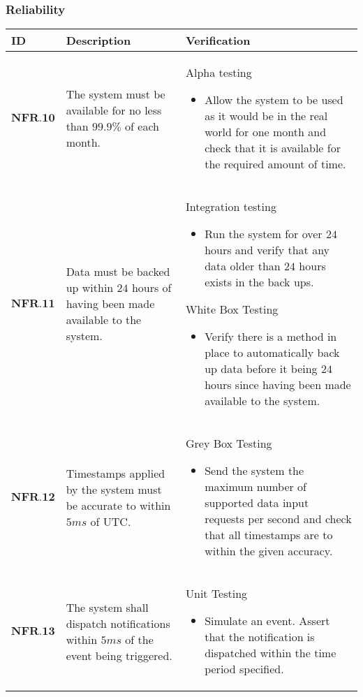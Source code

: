 \subsubsection{Reliability}
\begin{longtable}[H]{|p{1.5cm}|p{4.5cm}|p{10.5cm}|}
    \hline
    \cellcolor{titleColor}\textbf{ID} & \cellcolor{titleColor}\textbf{Description} & \cellcolor{titleColor}\textbf{Verification} \\ \hline
   $ \textbf{NFR.10} $ & The system must be available for no less than $99.9\%$ of each month. & Alpha testing\begin{itemize}\item Allow the system to be used as it would be in the real world for one month and check that it is available for the required amount of time.\end{itemize} \\ \hline
    $ \textbf{NFR.11} $ & Data must be backed up within $24$ hours of having been made available to the system. & Integration testing\begin{itemize}\item Run the system for over $24$ hours and verify that any data older than $24$ hours exists in the back ups.\end{itemize}White Box Testing\begin{itemize}\item Verify there is a method in place to automatically back up data before it being $24$ hours since having been made available to the system.\end{itemize} \\ \hline
   $ \textbf{NFR.12} $ & Timestamps applied by the system must be accurate to within $5ms$ of UTC. & Grey Box Testing\begin{itemize}\item Send the system the maximum number of supported data input requests per second and check that all timestamps are to within the given accuracy.\end{itemize} \\ \hline
   $ \textbf{NFR.13} $ & The system shall dispatch notifications within $5ms$ of the event being triggered. & Unit Testing\begin{itemize}\item Simulate an event. Assert that the notification is dispatched within the time period specified.\end{itemize} \\ \hline
\end{longtable}

